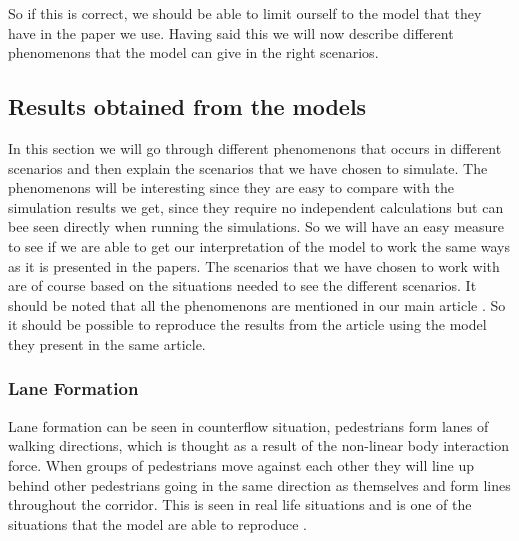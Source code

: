 So if this is correct, we should be able to limit ourself to the model that they have in the paper we use. Having said this we will now describe different phenomenons that the model can give in the right scenarios.  





\subsection{Results obtained from the models}
In this section we will go through different phenomenons that occurs in different scenarios and then explain the scenarios that we have chosen to simulate. The phenomenons will be interesting since they are easy to compare with the simulation results we get, since they require no independent calculations but can bee seen directly when running the simulations. So we will have an easy measure to see if we are able to get our interpretation of the model to work the same ways as it is presented in the papers. The scenarios that we have chosen to work with are of course based on the situations needed to see the different scenarios. It should be noted that all the phenomenons are mentioned in our main article \cite{self-org}. So it should be possible to reproduce the results from the article using the model they present in the same article. 

\subsubsection{Lane Formation}
Lane formation can be seen in counterflow situation, pedestrians form lanes of walking 
directions, which is thought as a result of the non-linear body interaction 
force. When groups of pedestrians move against each other they will line up behind other pedestrians going in the same direction as themselves and form lines throughout the corridor. This is seen in real life situations and is one of the situations that the model are able to reproduce \cite{self-org}. 



